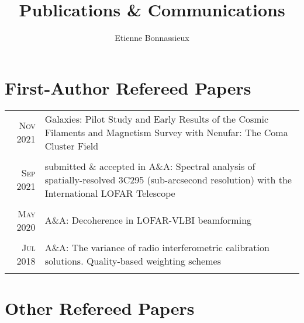 \documentclass[11pt,a4paper,notitlepage]{article}
\author{Etienne Bonnassieux}
\title{Publications \& Communications}
\date{}
\begin{document}
\maketitle

\section{First-Author Refereed Papers}

\begin{tabular}{r|p{12.5cm}}
	
	\textsc{Nov 2021} & Galaxies: Pilot Study and Early Results of the Cosmic Filaments and Magnetism Survey with Nenufar: The Coma Cluster Field \citep{2021Galax...9..105B}\\
	\multicolumn{2}{c}{} \\
	
	\textsc{Sep 2021} & submitted \& accepted in A\&A: Spectral analysis of spatially-resolved 3C295 (sub-arcsecond resolution) with the International LOFAR Telescope \citep{2021arXiv210807294B}\\
	\multicolumn{2}{c}{} \\
	
	\textsc{May 2020} & A\&A: Decoherence in LOFAR-VLBI beamforming \citep{2020AA...637A..51B}\\
	\multicolumn{2}{c}{} \\
	
	\textsc{Jul 2018} & A\&A: The variance of radio interferometric calibration solutions. Quality-based weighting schemes \citep{2018AA...615A..66B}\\
	\multicolumn{2}{c}{} \\
	
\end{tabular}


\section{Other Refereed Papers}
\end{document}
